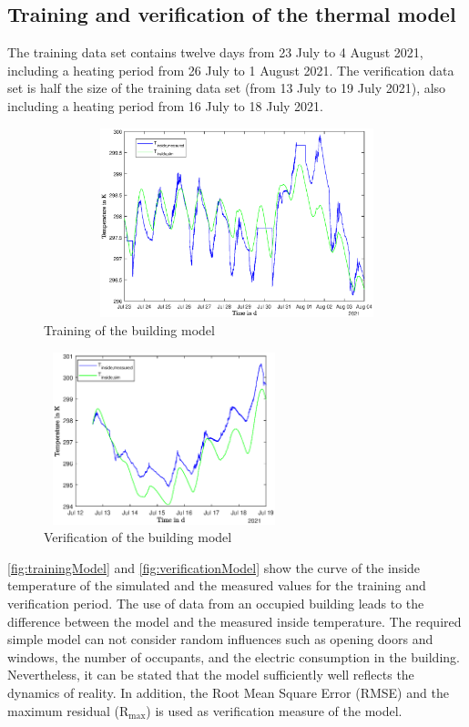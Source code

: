     \subsection{Training and verification of the thermal model}
    \label{verificationthermalmodel}
    The training data set contains twelve days from 23 July to 4 August 2021, including a heating period from 26 July to 1 August 2021. The verification data set is half the size of the training data set (from 13 July to 19 July 2021), also including a heating period from 16 July to 18 July 2021. \newline
    \begin{figure}[h]
            \centering
            \includegraphics[width=14cm,height=5.5cm]{figure/Training_inside.eps}
           \caption{Training of the building model}
           \label{fig:trainingModel}
    \end{figure}
    \begin{figure}[h]
            \centering
            \includegraphics[width=7cm,height=5cm]{figure/Validation_inside.eps}
           \caption{Verification of the building model}
           \label{fig:verificationModel}
    \end{figure}
   \autoref{fig:trainingModel} and \autoref{fig:verificationModel} show the curve of the inside temperature of the simulated and the measured values for the training and verification period. The use of data from an occupied building leads to the difference between the model and the measured inside temperature. The required simple model can not consider random influences such as opening doors and windows, the number of occupants, and the electric consumption in the building. Nevertheless, it can be stated that the model sufficiently well reflects the dynamics of reality. In addition, the Root Mean Square Error (RMSE)  and the maximum residual ($\mathrm{R}_\text{max}$) is used as verification measure of the model.\newline
